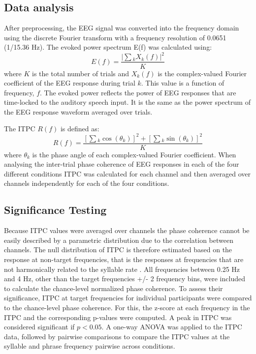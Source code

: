 \documentclass[10pt,letterpaper]{article}
\begin{document}
\subsection*{Data analysis}

After preprocessing, the EEG signal was converted into the frequency domain using the discrete Fourier transform with a frequency resolution of 0.0651 (1/15.36 Hz). The evoked power spectrum E(f) was calculated using:
\begin{equation}
\label{eq:power}
E(f)=\frac{\left|\sum{_k}X_k(f)\right|^2}{K}
\end{equation}
where $K$ is the total number of trials and $X_k(f)$ is the complex-valued Fourier coefficient of the EEG response during trial $k$. This value is a function of frequency, $f$. The evoked power reflects the power of EEG responses that are time-locked to the auditory speech input. It is the same as the power spectrum of the EEG response waveform averaged over trials.

The ITPC $R(f)$ is defined as:
\begin{equation}
\label{eq:itpc}
R(f)=\frac{\left[\sum{_k}\cos(\theta_k)\right]^2+\left[\sum{_k}\sin(\theta_k)\right]^2}{K}
\end{equation}
 where $\theta_k$ is the phase angle of each complex-valued Fourier coefficient. When analysing the inter-trial phase coherence of EEG responses in each of the four different conditions ITPC was calculated for each channel and then averaged over channels independently for each of the four conditions. 

\subsection*{Significance Testing}

Because ITPC values were averaged over channels the phase coherence cannot be easily described by a parametric distribution due to the correlation between channels. The null distribution of ITPC is therefore estimated based on the response at non-target frequencies, that is the responses at frequencies that are not harmonically related to the syllable rate \cite{DingEtAl2017}. All frequencies between 0.25 Hz and 4 Hz, other than the target frequencies +/- 2 frequency bins, were included to calculate the chance-level normalized phase coherence. To assess their significance, ITPC at target frequencies for individual participants were compared to the chance-level phase coherence. For this, the z-score at each frequency in the ITPC and the corresponding p-values were computed. A peak in ITPC was considered significant if $p < 0.05$. A one-way ANOVA was applied to the ITPC data, followed by pairwise comparisons to compare the ITPC values at the syllable and phrase frequency pairwise across conditions.
\end{document}
